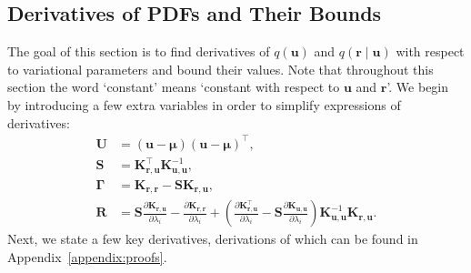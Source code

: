 \documentclass{mpaper}
\newcommand{\Kuu}{\mathbf{K}_{\mathbf{u},\mathbf{u}}}
\newcommand{\Krr}{\mathbf{K}_{\mathbf{r},\mathbf{r}}}
\newcommand{\Kru}{\mathbf{K}_{\mathbf{r},\mathbf{u}}}
\begin{document}
\subsection{Derivatives of PDFs and Their Bounds} \label{sec:derivatives}

The goal of this section is to find derivatives of $q(\mathbf{u})$ and
$q(\mathbf{r} \mid \mathbf{u})$ with respect to variational parameters and
bound their values. Note that throughout this section the word `constant' means
`constant with respect to $\mathbf{u}$ and $\mathbf{r}$'. We begin by
introducing a few extra variables in order to simplify expressions of
derivatives:
\begin{align*}
  \mathbf{U} &= (\mathbf{u} - \bm\mu)(\mathbf{u} - \bm\mu)^\intercal, \\
  \mathbf{S} &= \Kru^\intercal\Kuu^{-1}, \\
  \bm\Gamma &= \Krr - \mathbf{S}\Kru, \\
  \mathbf{R} &= \mathbf{S}\frac{\partial \Kru}{\partial \lambda_i} - \frac{\partial \Krr}{\partial \lambda_i} + \left( \frac{\partial \Kru^\intercal}{\partial \lambda_i} - \mathbf{S}\frac{\partial \Kuu}{\partial \lambda_i} \right) \Kuu^{-1}\Kru.
\end{align*}
Next, we state a few key derivatives, derivations of which can be found in
Appendix~\ref{appendix:proofs}.
\end{document}
